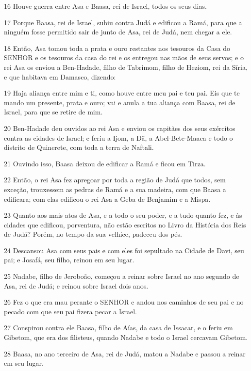 \par 16 Houve guerra entre Asa e Baasa, rei de Israel, todos os seus dias.
\par 17 Porque Baasa, rei de Israel, subiu contra Judá e edificou a Ramá, para que a ninguém fosse permitido sair de junto de Asa, rei de Judá, nem chegar a ele.
\par 18 Então, Asa tomou toda a prata e ouro restantes nos tesouros da Casa do SENHOR e os tesouros da casa do rei e os entregou nas mãos de seus servos; e o rei Asa os enviou a Ben-Hadade, filho de Tabrimom, filho de Heziom, rei da Síria, e que habitava em Damasco, dizendo:
\par 19 Haja aliança entre mim e ti, como houve entre meu pai e teu pai. Eis que te mando um presente, prata e ouro; vai e anula a tua aliança com Baasa, rei de Israel, para que se retire de mim.
\par 20 Ben-Hadade deu ouvidos ao rei Asa e enviou os capitães dos seus exércitos contra as cidades de Israel; e feriu a Ijom, a Dã, a Abel-Bete-Maaca e todo o distrito de Quinerete, com toda a terra de Naftali.
\par 21 Ouvindo isso, Baasa deixou de edificar a Ramá e ficou em Tirza.
\par 22 Então, o rei Asa fez apregoar por toda a região de Judá que todos, sem exceção, trouxessem as pedras de Ramá e a sua madeira, com que Baasa a edificara; com elas edificou o rei Asa a Geba de Benjamim e a Mispa.
\par 23 Quanto aos mais atos de Asa, e a todo o seu poder, e a tudo quanto fez, e às cidades que edificou, porventura, não estão escritos no Livro da História dos Reis de Judá? Porém, no tempo da sua velhice, padeceu dos pés.
\par 24 Descansou Asa com seus pais e com eles foi sepultado na Cidade de Davi, seu pai; e Josafá, seu filho, reinou em seu lugar.
\par 25 Nadabe, filho de Jeroboão, começou a reinar sobre Israel no ano segundo de Asa, rei de Judá; e reinou sobre Israel dois anos.
\par 26 Fez o que era mau perante o SENHOR e andou nos caminhos de seu pai e no pecado com que seu pai fizera pecar a Israel.
\par 27 Conspirou contra ele Baasa, filho de Aías, da casa de Issacar, e o feriu em Gibetom, que era dos filisteus, quando Nadabe e todo o Israel cercavam Gibetom.
\par 28 Baasa, no ano terceiro de Asa, rei de Judá, matou a Nadabe e passou a reinar em seu lugar.
